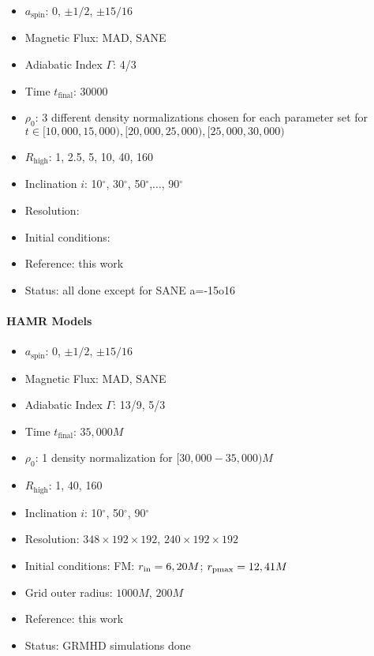 \begin{itemize}[noitemsep]
\item $a_\mathrm{spin}$: 0, $\pm1/2$, $\pm15/16$
\item Magnetic Flux: MAD, SANE
\item Adiabatic Index $\Gamma$: 4/3
\item Time $t_\mathrm{final}$: 30000
\item $\rho_0$: 3 different density normalizations chosen for each parameter set for $t \in [10,000, 15,000), [20,000, 25,000), [25,000, 30,000)$
\item $R_\mathrm{high}$: 1, 2.5, 5, 10, 40, 160
\item Inclination $i$: 10$^\circ$, 30$^\circ$, 50$^\circ$,..., 90$^\circ$ 
\item Resolution:
\item Initial conditions:
\item Reference: this work
\item Status: all done except for SANE a=-15o16
\end{itemize}

\paragraph{HAMR Models}

\begin{itemize}[noitemsep]
\item $a_\mathrm{spin}$: 0, $\pm1/2$, $\pm15/16$
\item Magnetic Flux: MAD, SANE
\item Adiabatic Index $\Gamma$: 13/9, 5/3
\item Time $t_\mathrm{final}$: $35,000M$
\item $\rho_0$: 1 density normalization for $[30,000-35,000)M$
\item $R_\mathrm{high}$: 1, 40, 160
\item Inclination $i$: 10$^\circ$, 50$^\circ$, 90$^\circ$
\item Resolution: $348\times 192\times 192$, $240\times 192\times 192$
\item Initial conditions: FM: $r_{\rm in}=6, 20M$; $r_{\rm pmax}=12, 41M$
\item Grid outer radius: $1000M$, $200M$
\item Reference: this work
\item Status: GRMHD simulations done
\end{itemize}

